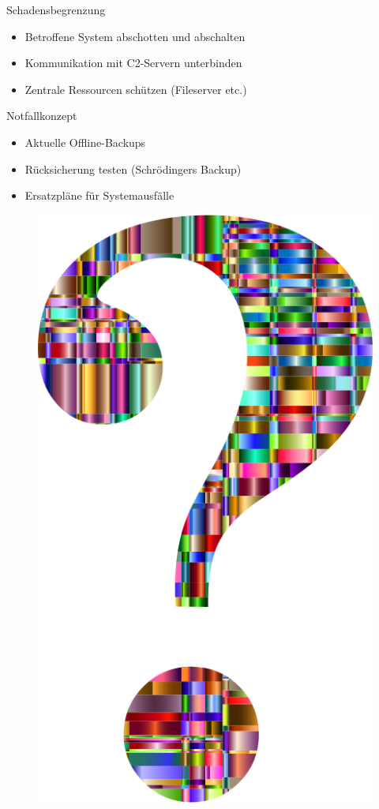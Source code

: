 \documentclass[10pt]{beamer}
\begin{document}
\begin{frame}{Schadensbegrenzung}
	\begin{itemize}
		\item Betroffene System abschotten und abschalten
		\item Kommunikation mit C2-Servern unterbinden
		\item Zentrale Ressourcen schützen (Fileserver etc.)
	\end{itemize}
\end{frame}

\begin{frame}{Notfallkonzept}
	\begin{itemize}
		\item Aktuelle Offline-Backups
		\item Rücksicherung testen (Schrödingers Backup)
						
		\item Ersatzpläne für Systemausfälle
 	\end{itemize}

\end{frame}


{\1
\begin{frame}
\end{frame}}

{\1
\begin{frame}
	\begin{figure}[p]
		\centering
		\includegraphics[scale=0.1]{questionmark.png}
	\end{figure}
\end{frame}}
\end{document}
